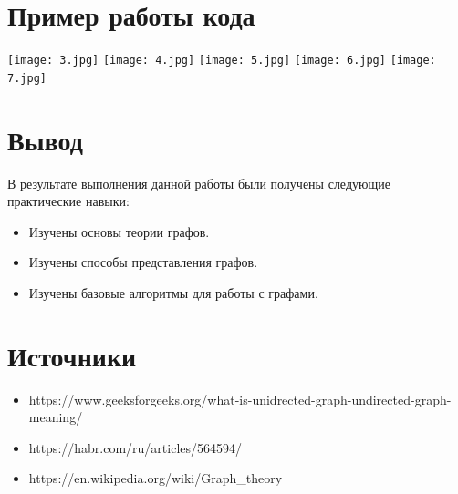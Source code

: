 \documentclass[12pt]{article}
\begin{document}
\section*{Пример работы кода}
 \texttt{[image: 3.jpg]}
 \texttt{[image: 4.jpg]}
 \texttt{[image: 5.jpg]}
 \texttt{[image: 6.jpg]}
 \texttt{[image: 7.jpg]}
\section*{Вывод}

В результате выполнения данной работы были получены следующие практические навыки:

\begin{itemize}
    \item Изучены основы теории графов.
    \item Изучены способы представления графов.
    \item Изучены базовые алгоритмы для работы с графами.
\end{itemize}

\section*{Источники}
\begin{itemize}
\item https://www.geeksforgeeks.org/what-is-unidrected-graph-undirected-graph-meaning/
\item https://habr.com/ru/articles/564594/
\item https://en.wikipedia.org/wiki/Graph_theory
\end{itemize}
\end{document}
